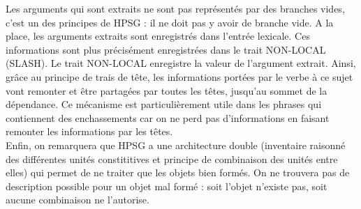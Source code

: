 	Les arguments qui sont extraits ne sont pas représentés par des branches vides, c'est un des principes de HPSG : il ne doit
	pas y avoir de branche vide. A la place, les arguments extraits sont enregistrés dans l'entrée lexicale. Ces informations
	sont plus précisément enregistrées dans le trait NON-LOCAL (SLASH). Le trait NON-LOCAL enregistre la valeur de l'argument
	extrait. Ainsi, grâce au principe de trais de tête, les informations portées par le verbe à ce sujet vont remonter et
	être partagées par toutes les têtes, jusqu'au sommet de la dépendance. Ce mécanisme est particulièrement utile dans les
	phrases qui contiennent des enchassements car on ne perd pas d'informations en faisant remonter les informations par les
	têtes.
	\\
	Enfin, on remarquera que HPSG a une architecture double (inventaire raisonné des différentes unités constititives et principe
	de combinaison des unités entre elles) qui permet de ne traiter que les objets bien formés. On ne trouvera pas de description
	possible pour un objet mal formé : soit l'objet n'existe pas, soit aucune combinaison ne l'autorise.



